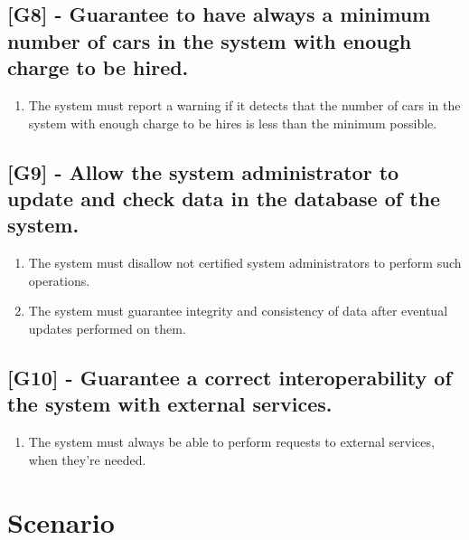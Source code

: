 \subsection{[G8] - Guarantee to have always a minimum number of cars in the system with enough charge to be hired.}
\begin{enumerate}[label=R8.\arabic*]
\item The system must report a warning if it detects that the number of cars in the system with enough charge to be hires is less than the minimum possible.
\end{enumerate}

\subsection{[G9] - Allow the system administrator to update and check data in the database of the system.}
\begin{enumerate}[label=R9.\arabic*]
\item The system must disallow not certified system administrators to perform such operations.
\item The system must guarantee integrity and consistency of data after eventual updates performed on them.
\end{enumerate}

\subsection{[G10] - Guarantee a correct interoperability of the system with external services.}
\begin{enumerate}[label=R10.\arabic*]
\item The system must always be able to perform requests to external services, when they’re needed.
\end{enumerate}

\section{Scenario}

